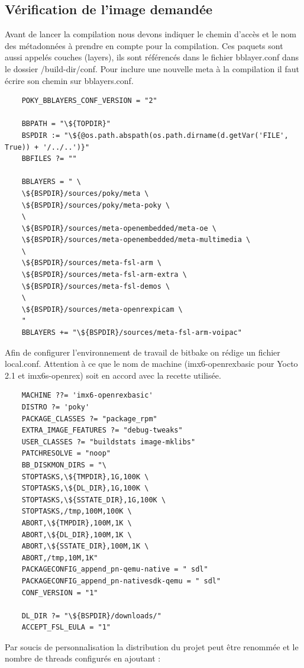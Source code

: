	\subsection{Vérification de l’image demandée}
	Avant de lancer la compilation nous devons indiquer le chemin d’accès et
	le nom des métadonnées à prendre en compte pour la compilation. Ces paquets
	sont aussi appelés couches (layers), ils sont référencés dans le fichier
	bblayer.conf dans le dossier /build-dir/conf. Pour inclure une nouvelle meta
	à la compilation il faut écrire son chemin sur bblayers.conf.

	\begin{lstlisting}
	POKY_BBLAYERS_CONF_VERSION = "2"

	BBPATH = "\${TOPDIR}"
	BSPDIR := "\${@os.path.abspath(os.path.dirname(d.getVar('FILE', True)) + '/../..')}"
	BBFILES ?= ""

	BBLAYERS = " \
	\${BSPDIR}/sources/poky/meta \
	\${BSPDIR}/sources/poky/meta-poky \
	\
	\${BSPDIR}/sources/meta-openembedded/meta-oe \
	\${BSPDIR}/sources/meta-openembedded/meta-multimedia \
	\
	\${BSPDIR}/sources/meta-fsl-arm \
	\${BSPDIR}/sources/meta-fsl-arm-extra \
	\${BSPDIR}/sources/meta-fsl-demos \
	\
	\${BSPDIR}/sources/meta-openrexpicam \
	"
	BBLAYERS += "\${BSPDIR}/sources/meta-fsl-arm-voipac"
	\end{lstlisting}

	Afin de configurer l’environnement de travail de bitbake on rédige un fichier local.conf. Attention à ce que le nom de machine (imx6-openrexbasic pour Yocto 2.1 et imx6s-openrex) soit en accord avec la recette utilisée.

	\begin{lstlisting}
	MACHINE ??= 'imx6-openrexbasic'
	DISTRO ?= 'poky'
	PACKAGE_CLASSES ?= "package_rpm"
	EXTRA_IMAGE_FEATURES ?= "debug-tweaks"
	USER_CLASSES ?= "buildstats image-mklibs"
	PATCHRESOLVE = "noop"
	BB_DISKMON_DIRS = "\
	STOPTASKS,\${TMPDIR},1G,100K \
	STOPTASKS,\${DL_DIR},1G,100K \
	STOPTASKS,\${SSTATE_DIR},1G,100K \
	STOPTASKS,/tmp,100M,100K \
	ABORT,\${TMPDIR},100M,1K \
	ABORT,\${DL_DIR},100M,1K \
	ABORT,\${SSTATE_DIR},100M,1K \
	ABORT,/tmp,10M,1K"
	PACKAGECONFIG_append_pn-qemu-native = " sdl"
	PACKAGECONFIG_append_pn-nativesdk-qemu = " sdl"
	CONF_VERSION = "1"

	DL_DIR ?= "\${BSPDIR}/downloads/"
	ACCEPT_FSL_EULA = "1"
	\end{lstlisting}

	Par soucis de personnalisation la distribution du projet peut être renommée et le nombre de threads configurés en ajoutant :

